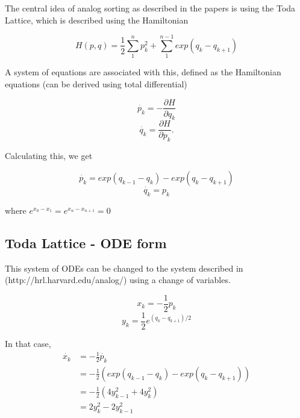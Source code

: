 

% 




The central idea of analog sorting as described in the papers is using the Toda Lattice, which is described using the Hamiltonian

\[ H(p,q) = \frac{1}{2} \sum^{n}_{1}p_k^2 + \sum^{n-1}_{1}exp(q_k-q_{k+1})\]

A system of equations are associated with this, defined as the Hamiltonian equations (can be derived using total differential)

\[\dot{p_k} = -\frac{\partial H}{\partial q_k}\]
\[\dot{q_k} = \frac{\partial H}{\partial p_k}.\]

Calculating this, we get

\[\dot{p_k} = exp(q_{k-1}-q_{k})-exp(q_{k}-q_{k+1}) \]
\[\dot{q_k} = p_k\]

where $e^{x_0-x_1}=e^{x_n-x_{n+1}}=0$

\subsection{Toda Lattice - ODE form}

This system of ODEs can  be changed to the system described in (http://hrl.harvard.edu/analog/) using a change of variables.

\[x_k = -\frac{1}{2}p_k\]
\[y_k = \frac{1}{2}e^{(q_k-q_{k+1})/2}\]

In that case, 
\begin{align*}
    \dot{x_k} &= -\frac{1}{2}\dot{p_k} \\
              &= -\frac{1}{2}(exp(q_{k-1}-q_{k})-exp(q_{k}-q_{k+1})) \\
              &= -\frac{1}{2}(4y^2_{k-1}+4y^2_k) \\
              &= 2y^2_k-2y^2_{k-1}
\end{align*}

